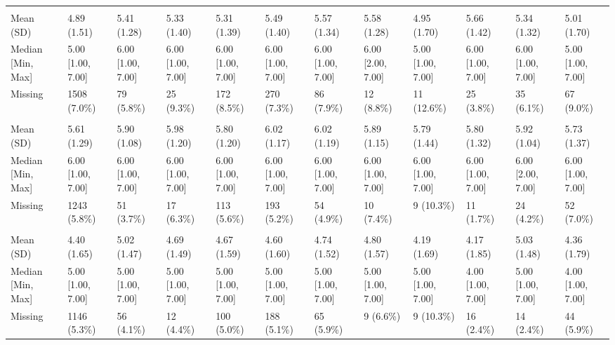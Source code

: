 \documentclass[
  single column]{article}
\begin{document}
\begin{landscape}
\begin{tabular}[t]{llllllllllll}
\addlinespace[0.3em]
\multicolumn{12}{l}{\textbf{Meaning: Purpose}}\\
\hspace{1em}Mean (SD) & 4.89 (1.51) & 5.41 (1.28) & 5.33 (1.40) & 5.31 (1.39) & 5.49 (1.40) & 5.57 (1.34) & 5.58 (1.28) & 4.95 (1.70) & 5.66 (1.42) & 5.34 (1.32) & 5.01 (1.70)\\
\hspace{1em}Median [Min, Max] & 5.00 [1.00, 7.00] & 6.00 [1.00, 7.00] & 6.00 [1.00, 7.00] & 6.00 [1.00, 7.00] & 6.00 [1.00, 7.00] & 6.00 [1.00, 7.00] & 6.00 [2.00, 7.00] & 5.00 [1.00, 7.00] & 6.00 [1.00, 7.00] & 6.00 [1.00, 7.00] & 5.00 [1.00, 7.00]\\
\hspace{1em}Missing & 1508 (7.0\%) & 79 (5.8\%) & 25 (9.3\%) & 172 (8.5\%) & 270 (7.3\%) & 86 (7.9\%) & 12 (8.8\%) & 11 (12.6\%) & 25 (3.8\%) & 35 (6.1\%) & 67 (9.0\%)\\
\addlinespace[0.3em]
\multicolumn{12}{l}{\textbf{Meaning: Sense}}\\
\hspace{1em}Mean (SD) & 5.61 (1.29) & 5.90 (1.08) & 5.98 (1.20) & 5.80 (1.20) & 6.02 (1.17) & 6.02 (1.19) & 5.89 (1.15) & 5.79 (1.44) & 5.80 (1.32) & 5.92 (1.04) & 5.73 (1.37)\\
\hspace{1em}Median [Min, Max] & 6.00 [1.00, 7.00] & 6.00 [1.00, 7.00] & 6.00 [1.00, 7.00] & 6.00 [1.00, 7.00] & 6.00 [1.00, 7.00] & 6.00 [1.00, 7.00] & 6.00 [1.00, 7.00] & 6.00 [1.00, 7.00] & 6.00 [1.00, 7.00] & 6.00 [2.00, 7.00] & 6.00 [1.00, 7.00]\\
\hspace{1em}Missing & 1243 (5.8\%) & 51 (3.7\%) & 17 (6.3\%) & 113 (5.6\%) & 193 (5.2\%) & 54 (4.9\%) & 10 (7.4\%) & 9 (10.3\%) & 11 (1.7\%) & 24 (4.2\%) & 52 (7.0\%)\\
\addlinespace[0.3em]
\multicolumn{12}{l}{\textbf{Community}}\\
\hspace{1em}Mean (SD) & 4.40 (1.65) & 5.02 (1.47) & 4.69 (1.49) & 4.67 (1.59) & 4.60 (1.60) & 4.74 (1.52) & 4.80 (1.57) & 4.19 (1.69) & 4.17 (1.85) & 5.03 (1.48) & 4.36 (1.79)\\
\hspace{1em}Median [Min, Max] & 5.00 [1.00, 7.00] & 5.00 [1.00, 7.00] & 5.00 [1.00, 7.00] & 5.00 [1.00, 7.00] & 5.00 [1.00, 7.00] & 5.00 [1.00, 7.00] & 5.00 [1.00, 7.00] & 5.00 [1.00, 7.00] & 4.00 [1.00, 7.00] & 5.00 [1.00, 7.00] & 4.00 [1.00, 7.00]\\
\hspace{1em}Missing & 1146 (5.3\%) & 56 (4.1\%) & 12 (4.4\%) & 100 (5.0\%) & 188 (5.1\%) & 65 (5.9\%) & 9 (6.6\%) & 9 (10.3\%) & 16 (2.4\%) & 14 (2.4\%) & 44 (5.9\%)\\

\end{tabular}
\end{landscape}
\end{document}
